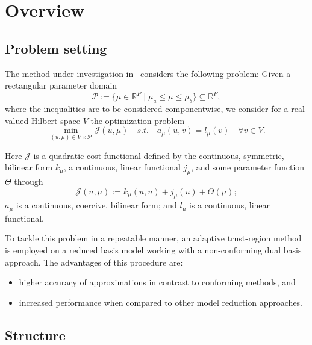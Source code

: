 \section{Overview}

\subsection{Problem setting}

The method under investigation in~\cite{Keil2021} considers the following problem: Given a rectangular parameter domain
\begin{equation*}\label{ParRect}
    \mathcal{P} := \{ \mu \in \mathbb{R}^P \; | \; \mu_a \leq \mu \leq \mu_b \} \subseteq \mathbb{R}^P,
\end{equation*}
where the inequalities are to be considered componentwise, we consider for a real-valued Hilbert space $V$ the optimization problem
\begin{equation}\label{SettingOpti}
    \min\limits_{(u, \mu) \in V \times \mathcal{P}} \mathcal{J}(u, \mu) \quad s.t. \quad a_\mu(u, v) = l_\mu(v) \quad \forall v \in V.
\end{equation}

Here $\mathcal{J}$ is a quadratic cost functional defined by the continuous, symmetric, bilinear form $k_\mu$, a continuous, linear functional $j_\mu$, and some parameter function $\Theta$ through
\begin{equation*}
    \mathcal{J}(u, \mu) := k_\mu(u, u) + j_\mu(u) + \Theta(\mu);
\end{equation*}
$a_\mu$ is a continuous, coercive, bilinear form; and $l_\mu$ is a continuous, linear functional.

To tackle this problem in a repeatable manner, an adaptive trust-region method is employed on a reduced basis model working with a non-conforming dual basis approach.
The advantages of this procedure are:
\begin{itemize}
    \item higher accuracy of approximations in contrast to conforming methods, and
    \item increased performance when compared to other model reduction approaches.
\end{itemize}

\subsection{Structure}

